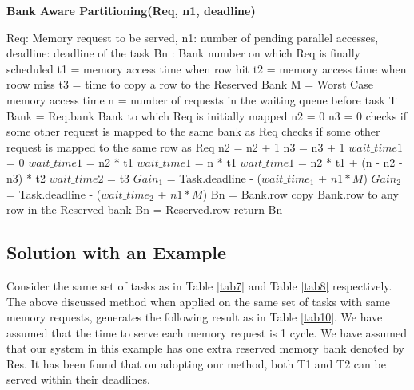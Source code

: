 \begin{algorithm}
 \caption{\bf Bank Aware Partitioning(Req, n1, deadline)}
  \begin{algorithmic}[1]
   Req: Memory request to be served, n1: number of pending parallel accesses, deadline: deadline of the task
   Bn : Bank number on which Req is finally scheduled
  \State t1 = memory access time when row hit
  \State t2 = memory access time when roow miss
  \State t3 = time to copy a row to the Reserved Bank
  \State M = Worst Case memory access time
  \State n = number of requests in the waiting queue before task T
  \State Bank = Req.bank \Comment Bank to which Req is initially mapped
  \State n2 = 0
  \State n3 = 0
  \Comment checks if some other request is mapped to the same bank as Req
  \Comment checks if some other request is mapped to the same row as Req 
  \State n2 = n2 + 1
  \EndIf
  \Else
  \State n3 = n3 + 1
  \EndIf
  \EndFor
   \State $wait\_time{1}$ = 0
   \State $wait\_time{1}$ = n2 * t1 
   \State $wait\_time{1}$ = n * t1 
   \EndIf
   \State $wait\_time{1}$ = n2 * t1 + (n - n2 - n3) * t2 
  \EndIf
  \State $wait\_time{2}$ = t3 
  \State $Gain_{1}$ = Task.deadline - ($wait\_time_{1}$ + $n1 * M$)
  \State $Gain_{2}$ = Task.deadline - ($wait\_time_{2}$ + $n1 * M$)
  \State Bn = Bank.row 
  \Else
  \State copy Bank.row to any row in the Reserved bank
  \State Bn = Reserved.row
  \EndIf
  \State return Bn
  \end{algorithmic}
\label{alg4}
\end{algorithm}

\subsection{Solution with an Example}\label{swae}
\noindent
Consider the same set of tasks as in Table \ref{tab7} and Table \ref{tab8} respectively. The above discussed method when 
applied on the same set of tasks with same memory requests, generates the following result as in Table \ref{tab10}. We have 
assumed that the time to serve each memory request is 1 cycle. We have assumed that our system in this example has one extra 
reserved memory bank denoted by Res. It has been found that on adopting our method, both T1 and T2 can be served within their 
deadlines.


